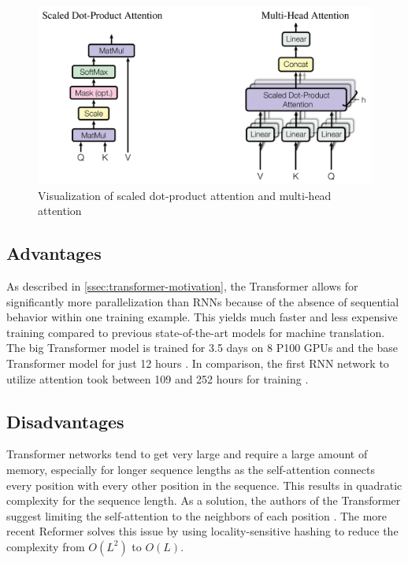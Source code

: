 \begin{figure}[h]
\centering
\includegraphics[width=0.7\paperwidth]{figures/scaled-dot-product-multihead-attention}
\caption[Visualization of scaled dot-product attention and multi-mead attention]{Visualization of scaled dot-product attention and multi-head attention \cite[p.~4]{1706.03762}}
\label{fig:scaled-dot-product-multihead-attention}
\end{figure}

\subsection{Advantages}

As described in \cref{ssec:transformer-motivation}, the Transformer allows for significantly more parallelization than RNNs because of the absence of sequential behavior within one training example.
This yields much faster and less expensive training compared to previous state-of-the-art models for machine translation.
The big Transformer model is trained for 3.5 days on 8 P100 GPUs and the base Transformer model for just 12 hours \cite[p.~7]{1706.03762}. 
In comparison, the first RNN network to utilize attention took between 109 and 252 hours for training \cite[p.~14]{1409.0473}.

\subsection{Disadvantages}

Transformer networks tend to get very large and require a large amount of memory, especially for longer sequence lengths as the self-attention connects every position with every other position in the sequence.
This results in quadratic complexity for the sequence length.
As a solution, the authors of the Transformer suggest limiting the self-attention to the neighbors of each position \cite[p.~6--7]{1706.03762}.  
The more recent Reformer \cite{kitaev2020reformer} solves this issue by using locality-sensitive hashing to reduce the complexity from $O(L^2)$ to $O(L)$.

